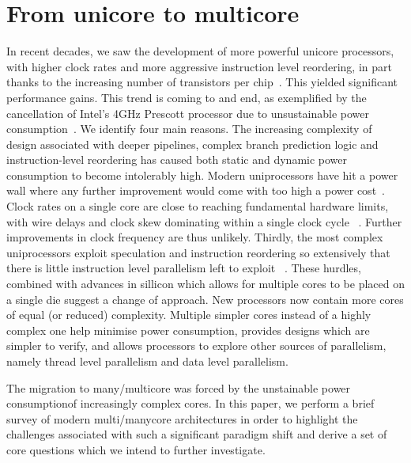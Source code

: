 \section{From unicore to multicore}

In recent decades, we saw the development of more powerful
unicore processors, with higher clock rates and more
aggressive instruction level reordering, in part
thanks to the increasing number of transistors per chip~\cite{SR97}.
This yielded significant performance gains. This trend is coming to and end,
as exemplified by the cancellation of Intel's
4GHz Prescott processor due to unsustainable
power consumption~\cite{Pentium}. We identify
four main reasons. The increasing complexity
of design associated with deeper pipelines,
complex branch prediction logic and instruction-level
reordering has caused both static and dynamic power consumption
to become intolerably high. Modern uniprocessors have hit
a power wall where any further improvement would come
with too high a power cost~\cite{EH11}. Clock rates on
a single core are close to reaching fundamental hardware limits,
with wire delays and clock skew dominating within a single clock cycle ~\cite{EH11}.
Further improvements in clock frequency are thus unlikely. Thirdly, the most
complex uniprocessors exploit speculation and instruction reordering so
extensively that there is little instruction level parallelism left to
exploit ~\cite{EH11}. These hurdles, combined with advances in sillicon which allows
for multiple cores to be placed on a single die suggest a change of approach.
 New processors now contain more cores of equal (or reduced) complexity.
Multiple simpler cores instead of a highly complex one help minimise power consumption,
provides designs which are simpler to verify, and allows processors
to explore other sources of parallelism, namely thread level parallelism
and data level parallelism.

The migration to many/multicore was forced by the unstainable power consumptionof increasingly complex cores. In this paper, we perform a brief
survey of modern multi/manycore architectures in order to highlight
the challenges associated with such a significant paradigm shift and derive
a set of core questions which we intend to further investigate.


